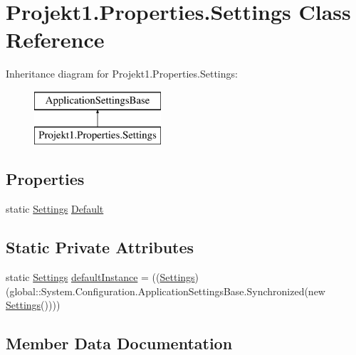 \hypertarget{class_projekt1_1_1_properties_1_1_settings}{}\section{Projekt1.\+Properties.\+Settings Class Reference}
\label{class_projekt1_1_1_properties_1_1_settings}
Inheritance diagram for Projekt1.\+Properties.\+Settings\+:\begin{figure}[H]
\begin{center}
\leavevmode
\includegraphics[height=2.000000cm]{class_projekt1_1_1_properties_1_1_settings}
\end{center}
\end{figure}
\subsection*{Properties}
\begin{DoxyCompactItemize}
\item 
static \mbox{\hyperlink{class_projekt1_1_1_properties_1_1_settings}{Settings}} \mbox{\hyperlink{class_projekt1_1_1_properties_1_1_settings_ad594e027ca2ba59c742fbd851a1ba331}{Default}}
\end{DoxyCompactItemize}
\subsection*{Static Private Attributes}
\begin{DoxyCompactItemize}
\item 
static \mbox{\hyperlink{class_projekt1_1_1_properties_1_1_settings}{Settings}} \mbox{\hyperlink{class_projekt1_1_1_properties_1_1_settings_a518e29e9ecc4c90a92558262ad10f638}{default\+Instance}} = ((\mbox{\hyperlink{class_projekt1_1_1_properties_1_1_settings}{Settings}})(global\+::\+System.\+Configuration.\+Application\+Settings\+Base.\+Synchronized(new \mbox{\hyperlink{class_projekt1_1_1_properties_1_1_settings}{Settings}}())))
\end{DoxyCompactItemize}


\subsection{Member Data Documentation}
\mbox{\label{class_projekt1_1_1_properties_1_1_settings_a518e29e9ecc4c90a92558262ad10f638}} 
